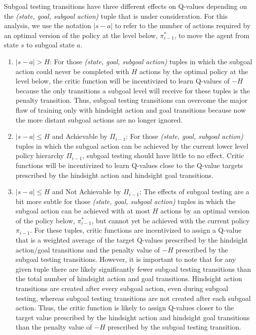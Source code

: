 \documentclass{article} %
\begin{document}
Subgoal testing transitions have three different effects on Q-values depending on the \textit{(state, goal, subgoal action)} tuple that is under consideration.  For this analysis, we use the notation $|s-a|$ to refer to the number of actions required by an optimal version of the policy at the level below, $\pi_{i-1}^*$, to move the agent from state $s$ to subgoal state $a$.
\begin{enumerate}
    \item $|s-a| > H$: For those \textit{(state, goal, subgoal action)} tuples in which the subgoal action could never be completed with $H$ actions by the optimal policy at the level below, the critic function will be incentivized to learn Q-values of $-H$ because the only transitions a subgoal level will receive for these tuples is the penalty transition.  Thus, subgoal testing transitions can overcome the major flaw of training only with hindsight action and goal transitions because now the more distant subgoal actions are no longer ignored. 
    
    \item $|s-a| \leq H$ and Achievable by $\Pi_{i-1}$:  For those \textit{(state, goal, subgoal action)} tuples in which the subgoal action can be achieved by the current lower level policy hierarchy $\Pi_{i-1}$, subgoal testing should have little to no effect.  Critic functions will be incentivized to learn Q-values close to the Q-value targets prescribed by the hindsight action and hindsight goal transitions.
    
    \item $|s-a| \leq H$ and Not Achievable by $\Pi_{i-1}$: The effects of subgoal testing are a bit more subtle for those \textit{(state, goal, subgoal action)} tuples in which the subgoal action can be achieved with at most $H$ actions by an optimal version of the policy below, $\pi_{i-1}^*$, but cannot yet be achieved with the current policy $\pi_{i-1}$.  For these tuples, critic functions are incentivized to assign a Q-value that is a weighted average of the target Q-values prescribed by the hindsight action/goal transitions and the penalty value of $-H$ prescribed by the subgoal testing transitions.  However, it is important to note that for any given tuple there are likely significantly fewer subgoal testing transitions than the total number of hindsight action and goal transitions.  Hindsight action transitions are created after every subgoal action, even during subgoal testing, whereas subgoal testing transitions are not created after each subgoal action.  Thus, the critic function is likely to assign Q-values closer to the target value prescribed by the hindsight action and hindsight goal transitions than the penalty value of $-H$ prescribed by the subgoal testing transition.
    
\end{enumerate}
\end{document}

